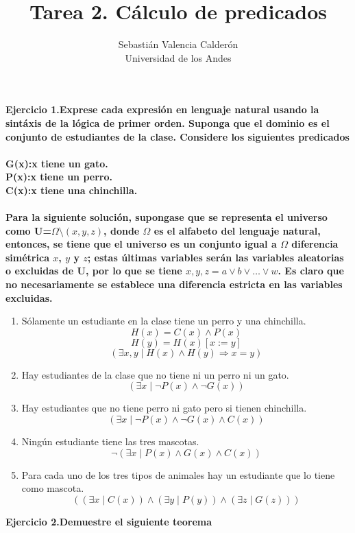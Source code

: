 \documentclass[12pt]{article}
\begin{document}
\title{Tarea 2. C\'alculo de predicados}
\author{Sebasti\'an Valencia Calder\'on\\
Universidad de los Andes}
\renewcommand{\today}{Marzo, 2013}
\maketitle

\bf{Ejercicio 1.}\rm Exprese cada expresi\'on en lenguaje natural usando la
sint\'axis de la l\'ogica de primer orden. Suponga que el dominio es el conjunto
de estudiantes de la clase. Considere los siguientes predicados
\\
\\
\bf{G(x):}\rm x tiene un gato. \\
\bf{P(x):}\rm x tiene un perro.\\
\bf{C(x):}\rm x tiene una chinchilla.\\ \\
Para la siguiente soluci\'on, supongase que se representa el universo como
\bf{U}\rm=$\Omega\setminus(x,y,z)$, donde $\Omega$ es el alfabeto del lenguaje
natural, entonces, se tiene que el universo es un conjunto igual a $\Omega$
diferencia sim\'etrica $x$, $y$ y $z$; estas \'ultimas variables ser\'an las
variables aleatorias o excluidas de \bf{U}\rm, por lo que se tiene $x, y, z=a
\vee b \vee \ldots \vee w$. Es claro que no necesariamente se establece una diferencia estricta en las variables
excluidas.
\begin{enumerate}
  \item S\'olamente un estudiante en la clase tiene un perro y una chinchilla. 
$$H(x)=  C(x) \wedge P(x) $$
$$H(y)=H(x)[x:=y]$$
$$(\exists x,y \mid H(x) \wedge H(y) \Rightarrow x=y )$$
 \item Hay estudiantes de la clase que no tiene ni un perro ni un gato.
$$(\exists x \mid \neg P(x) \wedge \neg G(x) )$$
 \item Hay estudiantes que no tiene perro ni gato pero si tienen chinchilla.
$$(\exists x \mid \neg P(x) \wedge \neg G(x) \wedge C(x))$$
\item Ning\'un estudiante tiene las tres mascotas.
$$\neg (\exists x \mid P(x) \wedge G(x) \wedge C(x))$$
\item Para cada uno de los tres tipos de animales hay un estudiante que lo tiene
como mascota.
$$((\exists x \mid C(x)) \wedge (\exists y \mid P(y)) \wedge (\exists z \mid
G(z)))$$
\end{enumerate}

\bf{Ejercicio 2.}\rm Demuestre el siguiente teorema
\end{document}
